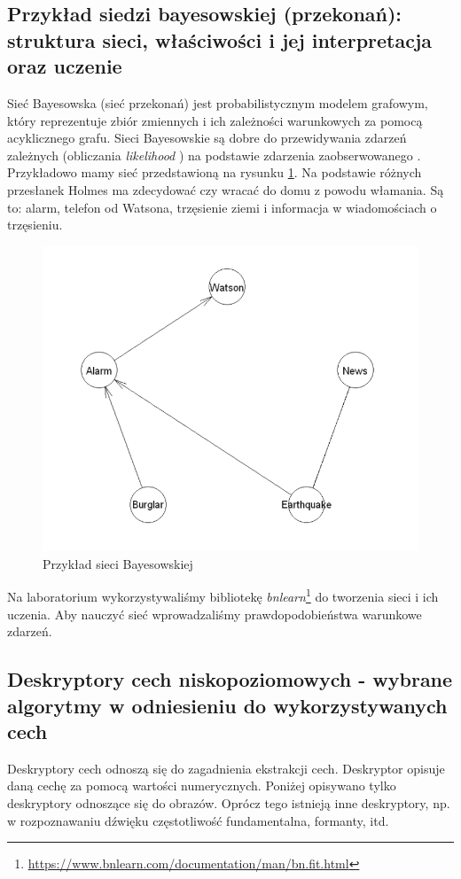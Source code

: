 \documentclass[wi]{zut}
\begin{document}
\subsection{Przykład siedzi bayesowskiej (przekonań): struktura sieci, właściwości i jej interpretacja oraz uczenie}

Sieć Bayesowska (sieć przekonań) jest probabilistycznym modelem grafowym, który reprezentuje zbiór zmiennych i ich zależności warunkowych za pomocą acyklicznego grafu. Sieci Bayesowskie są dobre do przewidywania zdarzeń zależnych (obliczania \emph{likelihood} \cite{wiki:Likelihood_function}) na podstawie zdarzenia zaobserwowanego 
\cite{wiki:Bayesian_network}. Przykładowo mamy sieć przedstawioną na rysunku \ref{fig:bayesian}. Na podstawie różnych przesłanek Holmes ma zdecydować czy wracać do domu z powodu włamania. Są to: alarm, telefon od Watsona, trzęsienie ziemi i informacja w wiadomościach o trzęsieniu.


\begin{figure}[H]
    \centering
    \includegraphics[width=0.5\linewidth]{images/bayesian.png}
    \caption{Przykład sieci Bayesowskiej}
    \label{fig:bayesian}
\end{figure}


Na laboratorium wykorzystywaliśmy bibliotekę \emph{bnlearn}\footnote{\url{https://www.bnlearn.com/documentation/man/bn.fit.html}} do tworzenia sieci i ich uczenia. Aby nauczyć sieć wprowadzaliśmy prawdopodobieństwa warunkowe zdarzeń.
\question

\subsection{Deskryptory cech niskopoziomowych - wybrane algorytmy w odniesieniu do wykorzystywanych cech}

Deskryptory cech odnoszą się do zagadnienia ekstrakcji cech. Deskryptor opisuje daną cechę za pomocą wartości numerycznych. Poniżej opisywano tylko deskryptory odnoszące się do obrazów. Oprócz tego istnieją inne deskryptory, np. w rozpoznawaniu dźwięku częstotliwość fundamentalna, formanty, itd.
\end{document}
